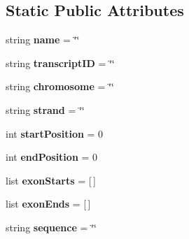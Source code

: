 \subsection*{Static Public Attributes}
\begin{DoxyCompactItemize}
\item 
\hypertarget{classgene_1_1_gene_a708074195322ffe28b19ec04eb703646}{string {\bfseries name} = \char`\"{}\char`\"{}}\label{classgene_1_1_gene_a708074195322ffe28b19ec04eb703646}

\item 
\hypertarget{classgene_1_1_gene_a453e9df0d07b23f6ade41ae635ca003c}{string {\bfseries transcript\+I\+D} = \char`\"{}\char`\"{}}\label{classgene_1_1_gene_a453e9df0d07b23f6ade41ae635ca003c}

\item 
\hypertarget{classgene_1_1_gene_adf9c516959efc5d643eb7de01e50a04b}{string {\bfseries chromosome} = \char`\"{}\char`\"{}}\label{classgene_1_1_gene_adf9c516959efc5d643eb7de01e50a04b}

\item 
\hypertarget{classgene_1_1_gene_a4f33daaa0bde33b9c0ce44cbcc03f82f}{string {\bfseries strand} = \char`\"{}\char`\"{}}\label{classgene_1_1_gene_a4f33daaa0bde33b9c0ce44cbcc03f82f}

\item 
\hypertarget{classgene_1_1_gene_a51139d8882bb9fed480504dd6aef712e}{int {\bfseries start\+Position} = 0}\label{classgene_1_1_gene_a51139d8882bb9fed480504dd6aef712e}

\item 
\hypertarget{classgene_1_1_gene_a57c01bf45d3dcbe94ead6f7f999ee719}{int {\bfseries end\+Position} = 0}\label{classgene_1_1_gene_a57c01bf45d3dcbe94ead6f7f999ee719}

\item 
\hypertarget{classgene_1_1_gene_a5f4fc7068e32531eef0fc2ab8faaaea8}{list {\bfseries exon\+Starts} = \mbox{[}$\,$\mbox{]}}\label{classgene_1_1_gene_a5f4fc7068e32531eef0fc2ab8faaaea8}

\item 
\hypertarget{classgene_1_1_gene_adcf9f27e981a5db63976f95015fffe47}{list {\bfseries exon\+Ends} = \mbox{[}$\,$\mbox{]}}\label{classgene_1_1_gene_adcf9f27e981a5db63976f95015fffe47}

\item 
\hypertarget{classgene_1_1_gene_af3db36708f8deb872b4d0391ef663df9}{string {\bfseries sequence} = \char`\"{}\char`\"{}}\label{classgene_1_1_gene_af3db36708f8deb872b4d0391ef663df9}

\end{DoxyCompactItemize}


